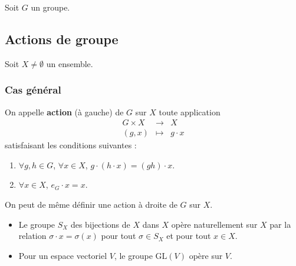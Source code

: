 




  Soit $G$ un groupe.

  \subsection{Actions de groupe}

  Soit $X \neq \emptyset$ un ensemble.

  \subsubsection{Cas général}


  \begin{definition}
    On appelle \textbf{action} (à gauche) de $G$ sur $X$ toute application
    \[
    \begin{array}{ccc}
      G \times X &\rightarrow& X \\
      (g, x) &\mapsto& g \cdot x
    \end{array}
    \]
    satisfaisant les conditions suivantes :
    \begin{enumerate}[label={\bfseries(\roman*)}]
      \item $\forall g, h \in G$, $\forall x \in X$, $g \cdot (h \cdot x) = (gh) \cdot x$.
      \item $\forall x \in X$, $e_G \cdot x = x$.
    \end{enumerate}
  \end{definition}

  \begin{remark}
    On peut de même définir une action à droite de $G$ sur $X$.
  \end{remark}

  \begin{example}
    \begin{itemize}
      \item Le groupe $S_X$ des bijections de $X$ dans $X$ opère naturellement sur $X$ par la relation $\sigma \cdot x = \sigma(x)$ pour tout $\sigma \in S_X$ et pour tout $x \in X$.
      \item Pour un espace vectoriel $V$, le groupe $\mathrm{GL}(V)$ opère sur $V$.
    \end{itemize}
  \end{example}

